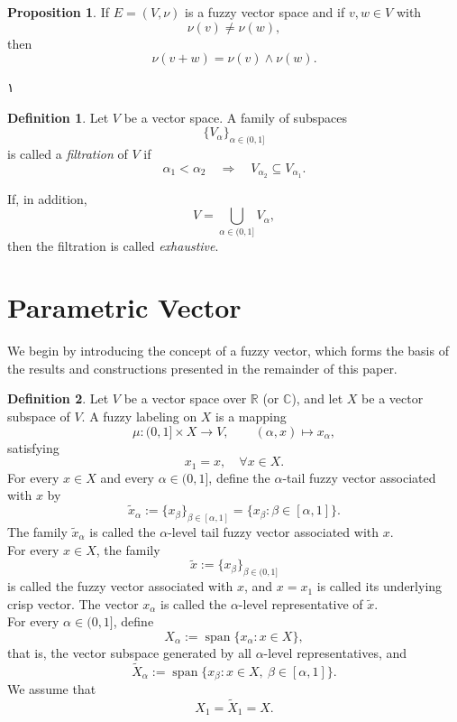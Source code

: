 \documentclass[preprint,12pt]{elsarticle}
\theoremstyle{definition}
\newtheorem{definition}{Definition}[section]
\newtheorem{proposition}{Proposition}[section]
\begin{document}
\begin{proposition}\cite{Lubczonok1990}
	If \(E=	(V,\nu)\) is a fuzzy vector space and if \(v,w\in V\) with
	\[
	\nu(v)\neq\nu(w),
	\]
	then
	\[
	\nu(v+w)=\nu(v)\wedge\nu(w).
	\]
\end{proposition}
۱\begin{definition}\cite{Ghrist2014}
	Let \(V\) be a vector space.
	A family of subspaces
	\[
	\{V_\alpha\}_{\alpha\in(0,1]}
	\]
	is called a \emph{filtration} of \(V\) if
	\[
	\alpha_1<\alpha_2
	\quad\Longrightarrow\quad
	V_{\alpha_2}\subseteq V_{\alpha_1}.
	\]
	
	If, in addition,
	\[
	V=\bigcup_{\alpha\in(0,1]}V_\alpha,
	\]
	then the filtration is called \emph{exhaustive}.
\end{definition}
\section{Parametric Vector}
We begin by introducing the concept of a fuzzy vector, which forms the basis of the results and constructions presented in the remainder of this paper.

\begin{definition}\label{def:fuzzyvector}
	Let $V$ be a vector space over $\mathbb{R}$ (or $\mathbb{C}$), and let $X$ be a vector subspace of $V$. A fuzzy labeling on $X$ is a mapping
	\[
	\mu : (0,1] \times X \longrightarrow V, \qquad (\alpha, x) \mapsto x_\alpha,
	\]
	satisfying
	\[
	x_1 = x, \quad \forall x \in X.
	\]
	For every $x \in X$ and every $\alpha \in (0,1]$, define the $\alpha$-tail fuzzy vector associated with $x$ by
	\begin{equation}\label{eq:alpha-tailfuzzyvector}
     \widetilde{x}_{\alpha}
	:= \{x_{\beta}\}_{\beta \in [\alpha,1]}
	= \{x_{\beta} : \beta \in [\alpha,1]\}.
		\end{equation}
	The family $\widetilde{x}_{\alpha}$ is called the $\alpha$-level tail fuzzy vector associated with $x$.\\
	For every $x \in X$, the family
	\begin{equation}\label{eq:fuzzyvectorassociated-x}
     \widetilde{x} := \{x_{\beta}\}_{\beta \in (0,1]}
     \end{equation}
	is called the fuzzy vector associated with $x$, and $x = x_1$ is called its underlying crisp vector. The vector $x_\alpha$ is called the $\alpha$-level representative of $\widetilde{x}$.\\
	For every $\alpha \in (0,1]$, define
	\begin{equation}\label{vectorspacegenerated-alpha-levelrepresentatives}
	X_{\alpha} := \operatorname{span}\{x_{\alpha} : x \in X\},
	\end{equation}
	that is, the vector subspace generated by all $\alpha$-level representatives,
	and
\begin{equation}\label{vectorsubspacegenerated-alpha-levelfuzzytail}
    \widetilde{X}_{\alpha} := \operatorname{span}\{x_{\beta} : x \in X,\ \beta \in [\alpha,1]\}.
\end{equation}
	We assume that
	\[
	X_{1} =	\widetilde{X}_{1} = X.
	\]
	
\end{definition}
\end{document}
